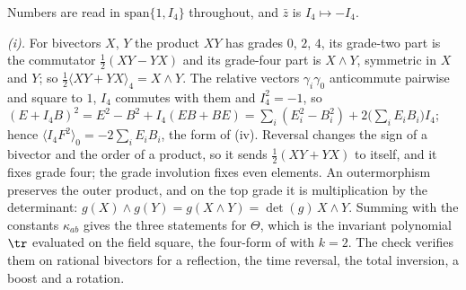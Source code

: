Numbers are read in $\mathrm{span}\{1, I_{4}\}$ throughout, and $\bar{z}$ is $I_{4} \mapsto -I_{4}$.

\emph{(i).} For bivectors $X$, $Y$ the product $XY$ has grades $0$, $2$, $4$, its grade-two part is the commutator $\tfrac12(XY - YX)$ and its grade-four part is $X \wedge Y$, symmetric in $X$ and $Y$; so $\tfrac12\langle XY + YX\rangle_{4} = X \wedge Y$. The relative vectors $\gamma_{i}\gamma_{0}$ anticommute pairwise and square to $1$, $I_{4}$ commutes with them and $I_{4}^{2} = -1$, so $(E + I_{4}B)^{2} = E^{2} - B^{2} + I_{4}(EB + BE) = \sum_{i}(E_{i}^{2} - B_{i}^{2}) + 2\bigl(\sum_{i}E_{i}B_{i}\bigr)I_{4}$; hence $\langle I_{4}F^{2}\rangle_{0} = -2\sum_{i}E_{i}B_{i}$, the form of (iv). Reversal changes the sign of a bivector and the order of a product, so it sends $\tfrac12(XY + YX)$ to itself, and it fixes grade four; the grade involution fixes even elements. An outermorphism preserves the outer product, and on the top grade it is multiplication by the determinant: $g(X) \wedge g(Y) = g(X \wedge Y) = \det(g)\,X \wedge Y$. Summing with the constants $\kappa_{ab}$ gives the three statements for $\Theta$, which is the invariant polynomial $\tr$ evaluated on the field square, the four-form of  with $k = 2$. The check verifies them on rational bivectors for a reflection, the time reversal, the total inversion, a boost and a rotation.

